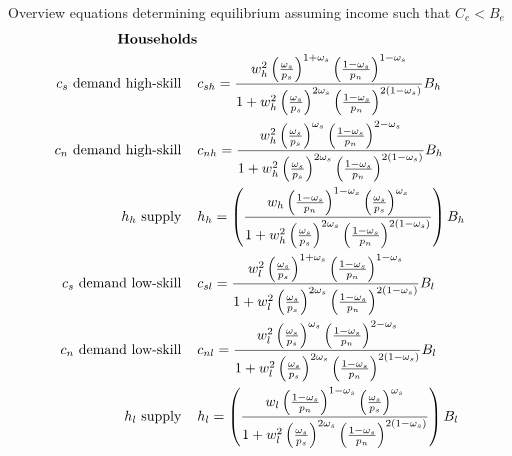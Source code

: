 Overview equations determining equilibrium assuming income such that $C_e<B_e$
\begin{align}
\text{\textbf{Households}}& \nonumber \\
\text{$c_s$ demand high-skill}\hspace{4mm}&c_{sh}=\frac{w_h^2\left(\frac{\omega_s}{p_s}\right)^{1+\omega_s}\left(\frac{1-\omega_s}{p_n}\right)^{1-\omega_s}}{1+w_h^2\left(\frac{\omega_s}{p_s}\right)^{2\omega_s}\left(\frac{1-\omega_s}{p_n}\right)^{2(1-\omega_s)}}B_h\\
\text{$c_n$ demand high-skill}\hspace{4mm}&c_{nh} = \frac{w_h^2\left(\frac{\omega_s}{p_s}\right)^{\omega_s}\left(\frac{1-\omega_s}{p_n}\right)^{2-\omega_s}}{1+w_h^2\left(\frac{\omega_s}{p_s}\right)^{2\omega_s}\left(\frac{1-\omega_s}{p_n}\right)^{2(1-\omega_s)}}B_h\\
\text{$h_h$ supply}\hspace{4mm}&
h_h= \left(\frac{w_h \left(\frac{1-\omega_s}{p_n}\right)^{1-\omega_s}\left(\frac{\omega_s}{p_s}\right)^{\omega_s}}{1+w_h^2\left(\frac{\omega_s}{p_s}\right)^{2\omega_s}\left(\frac{1-\omega_s}{p_n}\right)^{2(1-\omega_s)}}\right)B_h\\
\text{$c_s$ demand low-skill}\hspace{4mm}&c_{sl}=\frac{w_l^2\left(\frac{\omega_s}{p_s}\right)^{1+\omega_s}\left(\frac{1-\omega_s}{p_n}\right)^{1-\omega_s}}{1+w_l^2\left(\frac{\omega_s}{p_s}\right)^{2\omega_s}\left(\frac{1-\omega_s}{p_n}\right)^{2(1-\omega_s)}}B_l\\
\text{$c_n$ demand low-skill}\hspace{4mm}&c_{nl}=\frac{w_l^2\left(\frac{\omega_s}{p_s}\right)^{\omega_s}\left(\frac{1-\omega_s}{p_n}\right)^{2-\omega_s}}{1+w_l^2\left(\frac{\omega_s}{p_s}\right)^{2\omega_s}\left(\frac{1-\omega_s}{p_n}\right)^{2(1-\omega_s)}}B_l\\
\text{$h_l$ supply}\hspace{4mm}& h_l= \left(\frac{w_l \left(\frac{1-\omega_s}{p_n}\right)^{1-\omega_s}\left(\frac{\omega_s}{p_s}\right)^{\omega_s}}{1+w_l^2\left(\frac{\omega_s}{p_s}\right)^{2\omega_s}\left(\frac{1-\omega_s}{p_n}\right)^{2(1-\omega_s)}}\right)B_l
\end{align}
\newpage
